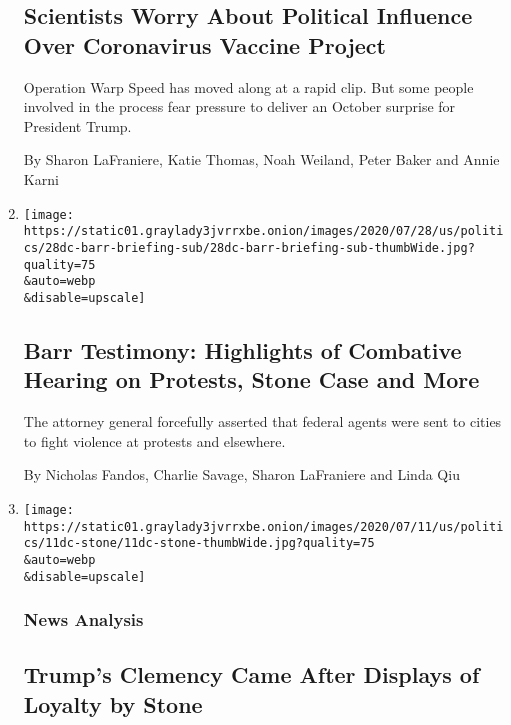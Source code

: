 \begin{enumerate}
  \hypertarget{scientists-worry-about-political-influence-over-coronavirus-vaccine-project}{%
  \subsection{Scientists Worry About Political Influence Over
  Coronavirus Vaccine
  Project}\label{scientists-worry-about-political-influence-over-coronavirus-vaccine-project}}

  Operation Warp Speed has moved along at a rapid clip. But some people
  involved in the process fear pressure to deliver an October surprise
  for President Trump.

  By Sharon LaFraniere, Katie Thomas, Noah Weiland, Peter Baker and
  Annie Karni
\item
  \href{/2020/07/28/us/politics/william-barr-house-judiciary-hearing.html}{}

  \texttt{[image: https://static01.graylady3jvrrxbe.onion/images/2020/07/28/us/politics/28dc-barr-briefing-sub/28dc-barr-briefing-sub-thumbWide.jpg?quality=75\\\&auto=webp\\\&disable=upscale]}

  \hypertarget{barr-testimony-highlights-of-combative-hearing-on-protests-stone-case-and-more}{%
  \subsection{Barr Testimony: Highlights of Combative Hearing on
  Protests, Stone Case and
  More}\label{barr-testimony-highlights-of-combative-hearing-on-protests-stone-case-and-more}}

  The attorney general forcefully asserted that federal agents were sent
  to cities to fight violence at protests and elsewhere.

  By Nicholas Fandos, Charlie Savage, Sharon LaFraniere and Linda Qiu
\item
  \href{/2020/07/11/us/politics/trump-roger-stone.html}{}

  \texttt{[image: https://static01.graylady3jvrrxbe.onion/images/2020/07/11/us/politics/11dc-stone/11dc-stone-thumbWide.jpg?quality=75\\\&auto=webp\\\&disable=upscale]}

  \hypertarget{news-analysis}{%
  \subsubsection{News Analysis}\label{news-analysis}}

  \hypertarget{trumps-clemency-came-after-displays-of-loyalty-by-stone}{%
  \subsection{Trump's Clemency Came After Displays of Loyalty by
  Stone}\label{trumps-clemency-came-after-displays-of-loyalty-by-stone}}


\end{enumerate}
